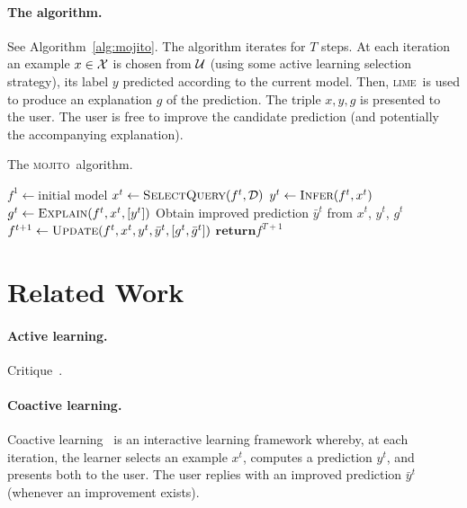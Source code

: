 \documentclass[a4paper,12pt]{article}
\newcommand{\lime}{\textsc{lime}}
\newcommand{\mojito}{\textsc{mojito}}
\begin{document}
\paragraph{The algorithm.} See Algorithm~\ref{alg:mojito}. The algorithm
iterates for $T$ steps. At each iteration an example $x \in \mathcal{X}$ is chosen
from $\calU$ (using some active learning selection strategy), its label $y$
predicted according to the current model.  Then, \lime\ is used to produce an
explanation $g$ of the prediction.  The triple $x, y, g$ is presented to the
user. The user is free to improve the candidate prediction (and potentially the
accompanying explanation).

\begin{algorithm*}[t]
    \caption{\label{alg:mojito} The \mojito\ algorithm.}
    \begin{algorithmic}[1]
        \Procedure{\mojito}{$\calL$, $\calU$, $T$}
            \State $f^1 \gets \text{initial model}$
                \State $x^t \gets \textsc{SelectQuery}(f^t, \mathcal{D})$
                \State $y^t \gets \textsc{Infer}(f^t, x^t)$
                \State $g^t \gets \textsc{Explain}(f^t, x^t,[y^t])$
                \State Obtain improved prediction $\bar{y}^t$ from $x^t$, $y^t$, $g^t$
                \State $f^{t+1} \gets \textsc{Update}(f^t,x^t,y^t,\bar{y}^t,[g^t,\bar{g}^t])$
            \EndFor
            \State $\textbf{return} f^{T+1}$
        \EndProcedure
    \end{algorithmic}
\end{algorithm*}


\section*{Related Work}

\paragraph{Active learning.} Critique~\cite{attenberg2011inactive}.

\paragraph{Coactive learning.} Coactive learning~\cite{shivaswamy2015coactive}
is an interactive learning framework whereby, at each iteration, the learner
selects an example $x^t$, computes a prediction $y^t$, and presents both to
the user. The user replies with an improved prediction $\bar{y}^t$ (whenever
an improvement exists).
\end{document}
